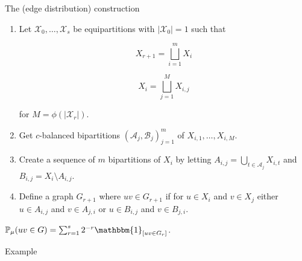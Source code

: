 \documentclass{beamer}
\newcommand{\1}{\mathbbm{1}}
\newcommand{\X}{\mathcal{X}}
\newcommand{\A}{\mathcal{A}}
\newcommand{\B}{\mathcal{B}}
\newcommand{\indicator}[1]{\1_{[#1]}}
\newcommand{\Prob}{\mathbb{P}}
\begin{document}
\begin{frame}{The (edge distribution) construction}
  \begin{enumerate}
    \pause
    \item Let $\X_0, \dots, \X_s$ be equipartitions with $|\X_0| = 1$ such that
          \begin{multicols}{2}
            \begin{equation}
              X_{r + 1} = \bigsqcup_{i = 1}^m X_i
            \end{equation}

            \begin{equation}
              X_i = \bigsqcup_{j = 1}^M X_{i, j}
            \end{equation}
          \end{multicols}
          for $M = \phi(|\X_r|)$.

          \pause

    \item Get $c$-balanced bipartitions $(\A_j, \B_j)_{j = 1}^m$ of $X_{i, 1}, \dots, X_{i, M}$.

          \pause

    \item Create a sequence of $m$ bipartitions of $X_i$ by letting $A_{i, j} =
            \bigcup_{t \in \A_j} X_{i, t}$ and $B_{i, j} = X_i \setminus A_{i, j}$.

          \pause

    \item Define a graph $G_{r + 1}$ where $uv \in G_{r + 1}$ if for $u \in X_i$ and
          $v \in X_j$ either $u \in A_{i, j}$ and $v \in A_{j, i}$ or $u \in B_{i, j}$
          and $v \in B_{j, i}$.
  \end{enumerate}

  \pause

  \begin{definition}
    $\Prob_\mu(uv \in G) = \sum_{r = 1}^s 2^{-r} \indicator{uv \in G_r}$.
  \end{definition}
\end{frame}

\begin{frame}{Example}

\end{frame}
\end{document}
